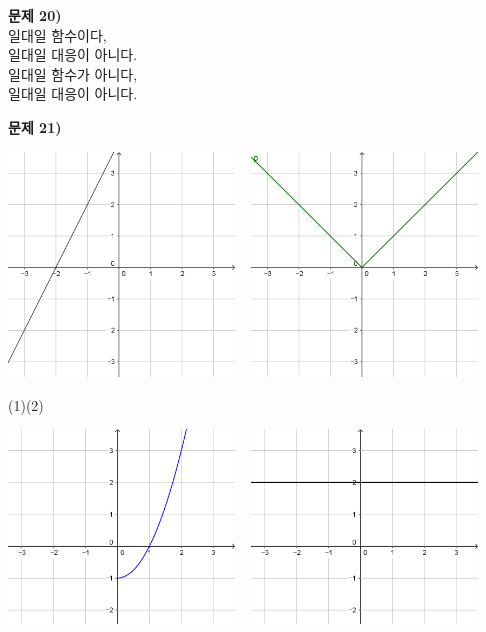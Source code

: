 \documentclass{oblivoir}
\newcommand\an[1]{\par\bigskip\noindent\textbf{문제 #1)}\\}
\begin{document}
\begin{minipage}{0.49\textwidth}
\an{20}
일대일 함수이다,\\
일대일 대응이 아니다.\\
일대일 함수가 아니다,\\
일대일 대응이 아니다.

%
\an{21}
\begin{center}
\includegraphics[width=0.45\textwidth]{pm3by3_y=2x+4}
~
\includegraphics[width=0.45\textwidth]{pm3by3_absx}
\par\noindent(1)\qquad\qquad\qquad\quad\:\:(2)\par\noindent
\includegraphics[width=0.45\textwidth]{pm3by3_x^2-1}
~
\includegraphics[width=0.45\textwidth]{pm3by3_y=2}

\end{center}
\end{minipage}
\end{document}
